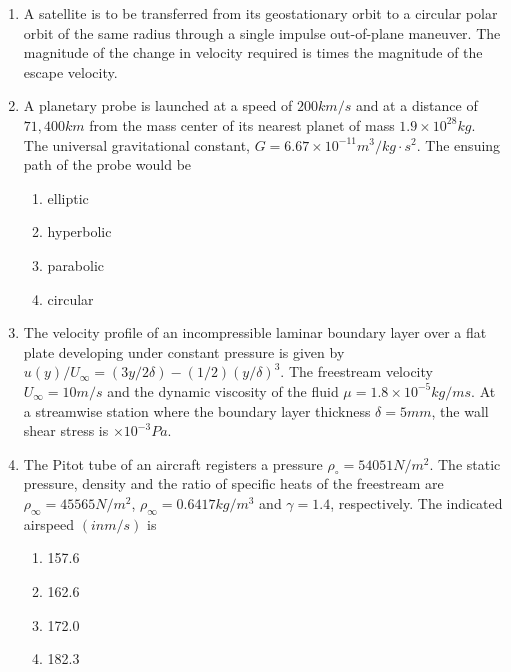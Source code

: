 \documentclass{article}
\begin{document}
\begin{enumerate}
\item A satellite is to be transferred from its geostationary orbit to a circular polar orbit of the same radius through a single impulse out-of-plane maneuver. The magnitude of the change in velocity required is \underline{\hspace{2cm}} times the magnitude of the escape velocity.


\item A planetary probe is launched at a speed of $200 km/s$ and at a distance of $71,400 km$ from the mass center of its nearest planet of mass $1.9 × 10^{28} kg$. The universal gravitational constant, $G = 6.67 × 10^{-11} m^3/kg·s^2$. The ensuing path of the probe would be

\begin{multicols}{4}
\begin{enumerate}
\item elliptic
\item hyperbolic
\item parabolic
\item circular
\end{enumerate}
\end{multicols}

\item The velocity profile of an incompressible laminar boundary layer over a flat plate developing under constant pressure is given by $u(y)/U_\infty = (3y/2\delta) - (1/2)(y/\delta)^3$. The freestream velocity $U_\infty = 10 m/s$ and the dynamic viscosity of the fluid $\mu = 1.8 \times 10^{-5} kg/ms$. At a streamwise station where the boundary layer thickness $\delta = 5 mm$, the wall shear stress is \underline{\hspace{2cm}} $\times 10^{-3} Pa$.


\item The Pitot tube of an aircraft registers a pressure $\rho_\circ = 54051 N/m^2$. The static pressure, density and the ratio of specific heats of the freestream are $\rho_\infty = 45565 N/m^2$, $\rho_\infty = 0.6417 kg/m^3$ and $\gamma = 1.4$, respectively. The indicated airspeed $(in m/s)$ is

\begin{multicols}{4}
\begin{enumerate}
\item 157.6
\item 162.6
\item 172.0
\item 182.3
\end{enumerate}
\end{multicols}


\end{enumerate}
\end{document}
